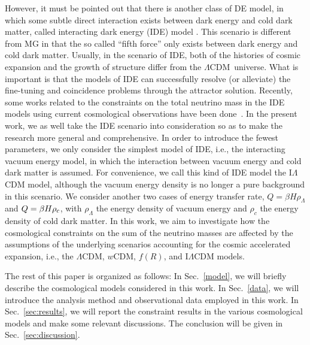 \documentclass[aps,prd,nofootinbib,amsmath,amssymb,twocolumn,superscriptaddress,10pt]{revtex4}%
\newcommand{\LCDM}{$\Lambda$CDM}
\begin{document}
{However, it must be pointed out that there is another class of DE model, in which some subtle direct interaction exists between dark energy and cold dark matter, called interacting dark energy (IDE) model} \cite{Amendola:1999er,Zimdahl:2005bk,Wang:2006qw,Guo:2007zk,Koyama:2009gd,Wei:2010cs,He:2010im,Li:2011ga,Zhang:2012uu,Zhang:2013lea,Li:2013bya,Geng:2015ara,Murgia:2016ccp,Wang:2016lxa,Pourtsidou:2016ico,Feng:2016djj,Xia:2016vnp,Costa:2016tpb,vandeBruck:2016hpz,Kumar:2017dnp,Sola:2017jbl,Zhang:2005rg,Zhang:2005rj,Zhang:2004gc,Zhang:2007uh,Li:2009zs,Zhang:2009qa,Wang:2014oga,Guo:2017deu,Li:2017usw}. This scenario is different from MG in that the so called ``fifth force'' only exists between dark energy and cold dark matter. Usually, in the scenario of IDE, both of the histories of cosmic expansion and the growth of structure differ from the \LCDM\ universe. {What is important is that the models of IDE can successfully resolve (or alleviate) the fine-tuning and coincidence problems through the attractor solution}. Recently, some works related to the constraints on the total neutrino mass in the IDE models using current cosmological observations have been done~\cite{Guo:2017hea,Guo:2018gyo}. {In the present work, we as well take the IDE scenario into consideration so as to make the research more general and comprehensive. In order to introduce the fewest parameters}, we only consider the simplest model of IDE, i.e., the interacting vacuum energy model, in which the interaction between vacuum energy and cold dark matter is assumed. {For convenience, we call this kind of IDE model the I$\Lambda$CDM model, although the vacuum energy density is no longer a pure background in this scenario. We consider another two cases of energy transfer rate, $Q=\beta H\rho_{\Lambda}$ and $Q=\beta H\rho_{\rm c}$, with $\rho_{\Lambda}$ the energy density of vacuum energy and $\rho_{c}$ the energy density of cold dark matter}. {In this work, we aim to investigate how the cosmological constraints on the sum of the neutrino masses are affected by the assumptions of the underlying scenarios accounting for the cosmic accelerated expansion, i.e., the $\Lambda$CDM, $w$CDM, $f(R)$, and I$\Lambda$CDM models.}

The rest of this paper is organized as follows: In Sec.~\ref{model}, we will briefly describe the cosmological models considered in this work. In Sec.~\ref{data}, we will introduce the analysis method and observational data employed in this work. In Sec.~\ref{sec:results}, we will report the constraint results in the various cosmological models and make some relevant discussions.  The conclusion will be given in Sec.~\ref{sec:discussion}.
\end{document}
